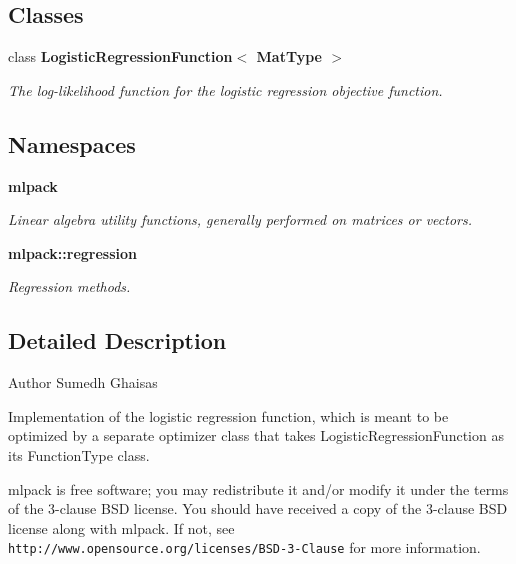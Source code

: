 \subsection*{Classes}
\begin{DoxyCompactItemize}
\item 
class \textbf{ Logistic\+Regression\+Function$<$ Mat\+Type $>$}
\begin{DoxyCompactList}\small\item\em The log-\/likelihood function for the logistic regression objective function. \end{DoxyCompactList}\end{DoxyCompactItemize}
\subsection*{Namespaces}
\begin{DoxyCompactItemize}
\item 
 \textbf{ mlpack}
\begin{DoxyCompactList}\small\item\em Linear algebra utility functions, generally performed on matrices or vectors. \end{DoxyCompactList}\item 
 \textbf{ mlpack\+::regression}
\begin{DoxyCompactList}\small\item\em Regression methods. \end{DoxyCompactList}\end{DoxyCompactItemize}


\subsection{Detailed Description}
\begin{DoxyAuthor}{Author}
Sumedh Ghaisas
\end{DoxyAuthor}
Implementation of the logistic regression function, which is meant to be optimized by a separate optimizer class that takes Logistic\+Regression\+Function as its Function\+Type class.

mlpack is free software; you may redistribute it and/or modify it under the terms of the 3-\/clause B\+SD license. You should have received a copy of the 3-\/clause B\+SD license along with mlpack. If not, see {\tt http\+://www.\+opensource.\+org/licenses/\+B\+S\+D-\/3-\/\+Clause} for more information. 